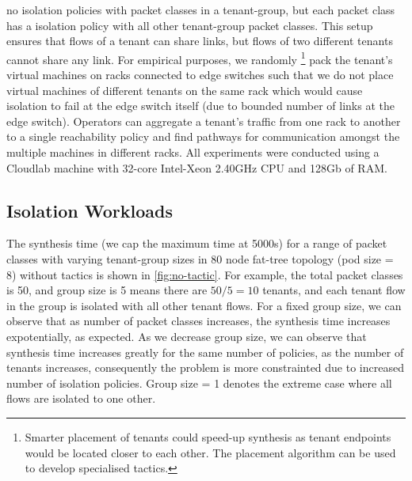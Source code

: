 no isolation policies with packet classes in a tenant-group, but each packet class
has a isolation policy with all other tenant-group packet classes. This setup ensures
that flows of a tenant can share links, but flows of two different tenants cannot share
any link. 
For empirical purposes, 
we randomly
\footnote{Smarter placement of tenants could speed-up synthesis as tenant endpoints would
	be located closer to each other. The placement algorithm can be used to develop specialised tactics.}
  pack the tenant's virtual machines on racks connected to edge switches such that
   we do not place virtual machines of different tenants on the same rack which would 
   cause isolation to fail at the edge switch itself (due to bounded number of links at
   the edge switch). Operators can aggregate a tenant's traffic from one rack to
another to a single reachability policy and find pathways for communication amongst the multiple
machines in different racks. 
All experiments were conducted using a Cloudlab machine with 32-core Intel-Xeon 2.40GHz CPU and 128Gb of RAM. 
\subsection{Isolation Workloads}
The synthesis time (we cap the maximum time at 5000s) for a range of
 packet classes with varying tenant-group sizes in 80 node fat-tree topology (pod size = 8) 
 without tactics is shown in \cref{fig:no-tactic}. For example, the total packet classes is 50, and group size is 5 means there
  are $50/5 = 10$ tenants, and each tenant flow in the group is isolated with all other tenant
   flows. For a fixed group size, we can observe that as number of packet classes increases,
    the synthesis time increases expotentially, as expected. As we decrease group size,
     we can observe that synthesis time increases greatly for the same number of policies,
      as the number of tenants increases, consequently the problem is more constrainted 
      due to increased number of isolation policies. 
      Group size = 1 denotes the extreme case where all flows are isolated to one other. 
      

